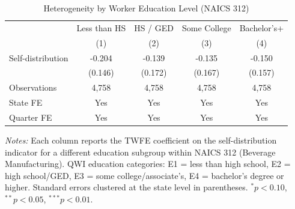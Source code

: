 \begin{table}[t]
\centering
\caption{Heterogeneity by Worker Education Level (NAICS 312)}
\label{tab:educ}
\begin{threeparttable}
\begin{tabular}{lcccc}
\toprule
 & Less than HS & HS / GED & Some College & Bachelor's+ \\
 & (1) & (2) & (3) & (4) \\
\midrule
Self-distribution & -0.204 & -0.139 & -0.135 & -0.150 \\
 & (0.146) & (0.172) & (0.167) & (0.157) \\
\midrule
Observations & 4,758 & 4,758 & 4,758 & 4,758 \\
State FE & Yes & Yes & Yes & Yes \\
Quarter FE & Yes & Yes & Yes & Yes \\
\bottomrule
\end{tabular}
\begin{tablenotes}[flushleft]\small
\item \textit{Notes:} Each column reports the TWFE coefficient on the self-distribution
indicator for a different education subgroup within NAICS 312 (Beverage Manufacturing).
QWI education categories: E1 = less than high school, E2 = high school/GED,
E3 = some college/associate's, E4 = bachelor's degree or higher. Standard errors
clustered at the state level in parentheses.
$^{*}p<0.10$, $^{**}p<0.05$, $^{***}p<0.01$.
\end{tablenotes}
\end{threeparttable}
\end{table}
